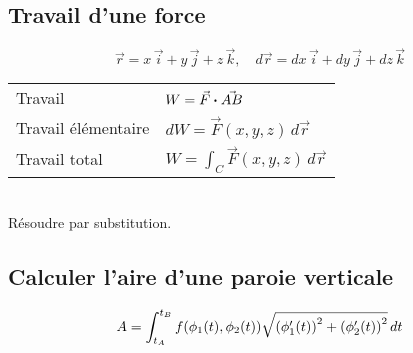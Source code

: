 \subsection{Travail d'une force}
\[\Vec{r} = x\,\Vec{i}+y\,\Vec{j}+z\,\Vec{k}, \quad d\Vec{r} = dx\,\Vec{i}+dy\,\Vec{j}+dz\,\Vec{k}\]
\begin{tabular}{ll}
    Travail & $W= \Vec{F}\vdot \Vec{AB}$ \\
    Travail élémentaire & $dW = \Vec{F}(x,y,z)\, d\Vec{r}$\\
    Travail total & $W = \int_C \Vec{F}(x,y,z)\, d\Vec{r}$
\end{tabular}\\
Résoudre par substitution.

\subsection{Calculer l'aire d'une paroie verticale}
\[A=\int^{t_{B}}_{t_{A}}f\qty(\phi_1(t),\phi_2(t))\sqrt{\qty(\phi_1^{\prime}(t))^2+\qty(\phi_2^{\prime}(t))^2}\,dt \]